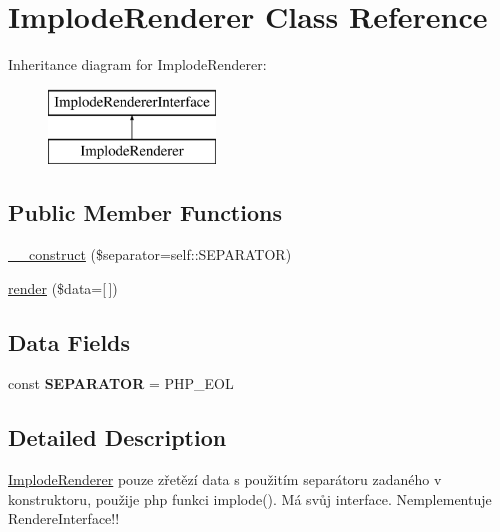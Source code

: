 \hypertarget{class_pes_1_1_view_1_1_renderer_1_1_implode_renderer}{}\section{Implode\+Renderer Class Reference}
\label{class_pes_1_1_view_1_1_renderer_1_1_implode_renderer}
Inheritance diagram for Implode\+Renderer\+:\begin{figure}[H]
\begin{center}
\leavevmode
\includegraphics[height=2.000000cm]{class_pes_1_1_view_1_1_renderer_1_1_implode_renderer}
\end{center}
\end{figure}
\subsection*{Public Member Functions}
\begin{DoxyCompactItemize}
\item 
\mbox{\hyperlink{class_pes_1_1_view_1_1_renderer_1_1_implode_renderer_a4b6106a9a357c0b3aa8f2fb3afcd3170}{\+\_\+\+\_\+construct}} (\$separator=self\+::\+S\+E\+P\+A\+R\+A\+T\+OR)
\item 
\mbox{\hyperlink{class_pes_1_1_view_1_1_renderer_1_1_implode_renderer_a1b881eb7caa4bce6bdcd753bf65ed865}{render}} (\$data=\mbox{[}$\,$\mbox{]})
\end{DoxyCompactItemize}
\subsection*{Data Fields}
\begin{DoxyCompactItemize}
\item 
\mbox{\label{class_pes_1_1_view_1_1_renderer_1_1_implode_renderer_a8e88e16132e9235e0f03b7581e8d4f62}} 
const {\bfseries S\+E\+P\+A\+R\+A\+T\+OR} = P\+H\+P\+\_\+\+E\+OL
\end{DoxyCompactItemize}


\subsection{Detailed Description}
\mbox{\hyperlink{class_pes_1_1_view_1_1_renderer_1_1_implode_renderer}{Implode\+Renderer}} pouze zřetězí data s použitím separátoru zadaného v konstruktoru, použije php funkci implode(). Má svůj interface. Nemplementuje Rendere\+Interface!!

